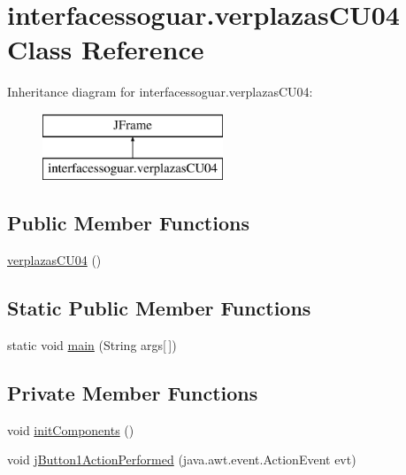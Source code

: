 \hypertarget{classinterfacessoguar_1_1verplazas_c_u04}{}\section{interfacessoguar.\+verplazas\+C\+U04 Class Reference}
\label{classinterfacessoguar_1_1verplazas_c_u04}
Inheritance diagram for interfacessoguar.\+verplazas\+C\+U04\+:\begin{figure}[H]
\begin{center}
\leavevmode
\includegraphics[height=2.000000cm]{classinterfacessoguar_1_1verplazas_c_u04}
\end{center}
\end{figure}
\subsection*{Public Member Functions}
\begin{DoxyCompactItemize}
\item 
\mbox{\hyperlink{classinterfacessoguar_1_1verplazas_c_u04_a7c480282265a6a9b53792a7c6733f3f1}{verplazas\+C\+U04}} ()
\end{DoxyCompactItemize}
\subsection*{Static Public Member Functions}
\begin{DoxyCompactItemize}
\item 
static void \mbox{\hyperlink{classinterfacessoguar_1_1verplazas_c_u04_af6da6c0d0f3975cf3a27627af8407ae8}{main}} (String args\mbox{[}$\,$\mbox{]})
\end{DoxyCompactItemize}
\subsection*{Private Member Functions}
\begin{DoxyCompactItemize}
\item 
void \mbox{\hyperlink{classinterfacessoguar_1_1verplazas_c_u04_a2ff9f21239da86da0eb45875e8de0337}{init\+Components}} ()
\item 
void \mbox{\hyperlink{classinterfacessoguar_1_1verplazas_c_u04_a7547091247028b25efb81115983cc7f2}{j\+Button1\+Action\+Performed}} (java.\+awt.\+event.\+Action\+Event evt)
\end{DoxyCompactItemize}
